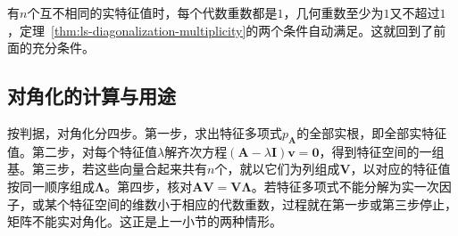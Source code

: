 有$n$个互不相同的实特征值时，每个代数重数都是$1$，几何重数至少为$1$又不超过$1$，定理~\ref{thm:ls-diagonalization-multiplicity}的两个条件自动满足。这就回到了前面的充分条件。

\subsection{对角化的计算与用途}

按判据，对角化分四步。第一步，求出特征多项式$p_{\bm A}$的全部实根，即全部实特征值。第二步，对每个特征值$\lambda$解齐次方程$(\bm A-\lambda\bm I)\bm v=\bm0$，得到特征空间的一组基。第三步，若这些向量合起来共有$n$个，就以它们为列组成$\bm V$，以对应的特征值按同一顺序组成$\bm\Lambda$。第四步，核对$\bm A\bm V=\bm V\bm\Lambda$。若特征多项式不能分解为实一次因子，或某个特征空间的维数小于相应的代数重数，过程就在第一步或第三步停止，矩阵不能实对角化。这正是上一小节的两种情形。

